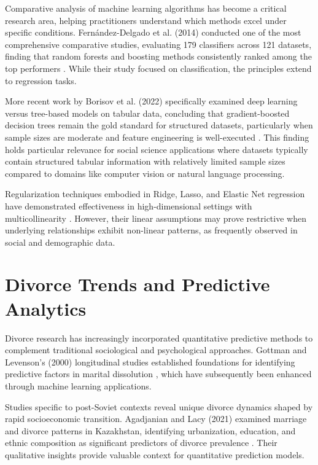 Comparative analysis of machine learning algorithms has become a critical research area, helping practitioners understand which methods excel under specific conditions. Fern\'andez-Delgado et al. (2014) conducted one of the most comprehensive comparative studies, evaluating 179 classifiers across 121 datasets, finding that random forests and boosting methods consistently ranked among the top performers \cite{fernandez2014we}. While their study focused on classification, the principles extend to regression tasks.

More recent work by Borisov et al. (2022) specifically examined deep learning versus tree-based models on tabular data, concluding that gradient-boosted decision trees remain the gold standard for structured datasets, particularly when sample sizes are moderate and feature engineering is well-executed \cite{borisov2022deep}. This finding holds particular relevance for social science applications where datasets typically contain structured tabular information with relatively limited sample sizes compared to domains like computer vision or natural language processing.

Regularization techniques embodied in Ridge, Lasso, and Elastic Net regression have demonstrated effectiveness in high-dimensional settings with multicollinearity \cite{hastie2009elements}. However, their linear assumptions may prove restrictive when underlying relationships exhibit non-linear patterns, as frequently observed in social and demographic data.

\section{Divorce Trends and Predictive Analytics}

Divorce research has increasingly incorporated quantitative predictive methods to complement traditional sociological and psychological approaches. Gottman and Levenson's (2000) longitudinal studies established foundations for identifying predictive factors in marital dissolution \cite{gottman2000decade}, which have subsequently been enhanced through machine learning applications.

Studies specific to post-Soviet contexts reveal unique divorce dynamics shaped by rapid socioeconomic transition. Agadjanian and Lacy (2021) examined marriage and divorce patterns in Kazakhstan, identifying urbanization, education, and ethnic composition as significant predictors of divorce prevalence \cite{agadjanian2021divorce}. Their qualitative insights provide valuable context for quantitative prediction models.

